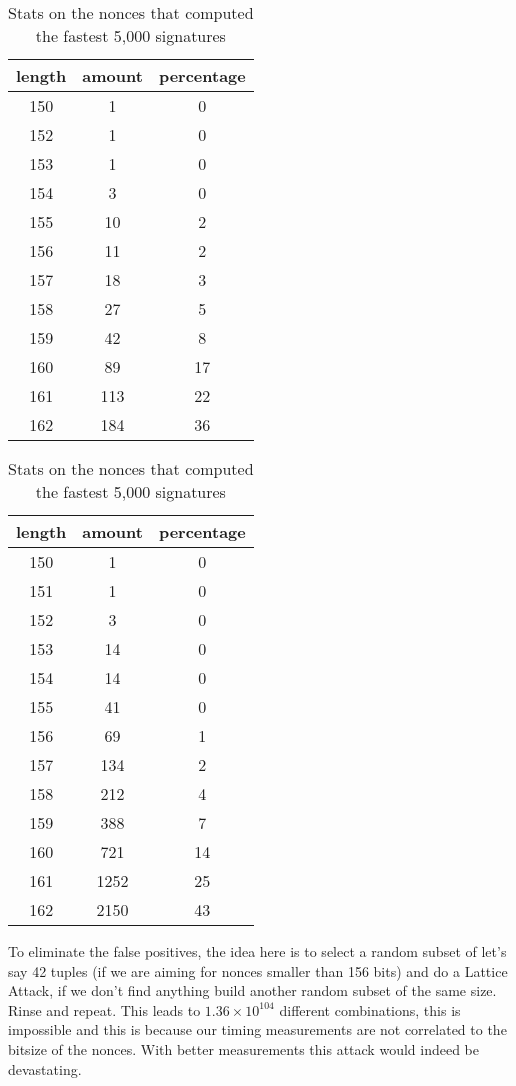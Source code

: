 \documentclass[a4paper,11pt]{article}
\begin{document}
\begin{table}[H]
\parbox{.45\linewidth}{
\centering
\begin{tabular}{@{} *3c @{}}
\toprule
length&amount&percentage\\
\midrule
150  &   1   &    0\\
152  &   1  &     0\\
153  &   1  &     0\\
154  &   3  &     0\\
155  &   10  &    2\\
156  &   11  &    2\\
157   &  18  &    3\\
158  &   27 &     5\\
159  &   42 &     8\\
160  &   89  &    17\\
161  &   113 &    22\\
162  &   184 &    36\\
\bottomrule
\end{tabular}
\caption{Stats on the nonces that computed the fastest 500 signatures}
}
\hfill
\parbox{.45\linewidth}{
\centering
\begin{tabular}{@{} *3c @{}}
\toprule
length&amount&percentage\\
\midrule
150  &   1     &  0\\
151   &  1  &     0\\
152  &   3 &      0\\
153   &  14  &    0\\
154  &   14 &     0\\
155  &   41 &     0\\
156   &  69  &    1\\
157  &   134    & 2\\
158   &  212&     4\\
159   &  388 &    7\\
160  &   721 &    14\\
161  &   1252   & 25\\
162    & 2150 &   43\\
\bottomrule
\end{tabular}
\caption{Stats on the nonces that computed the fastest 5,000 signatures}
}
\end{table}

To eliminate the false positives, the idea here is to select a random subset of let's say 42 tuples (if we are aiming for nonces smaller than 156 bits) and do a Lattice Attack, if we don't find anything build another random subset of the same size. Rinse and repeat. This leads to $1.36 \times 10^{104}$ different combinations, this is impossible and this is because our timing measurements are not correlated to the bitsize of the nonces. With better measurements this attack would indeed be devastating.
\end{document}
